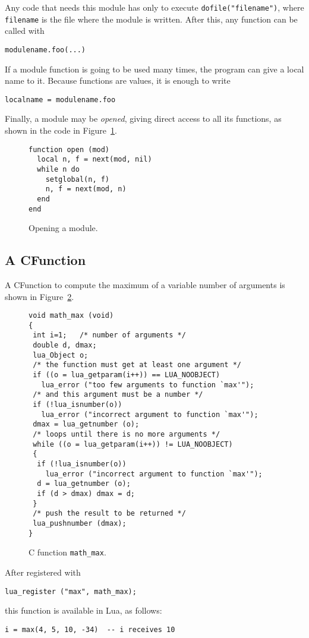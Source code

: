 Any code that needs this module has only to execute
\verb'dofile("filename")', where \verb'filename' is the file
where the module is written.
After this, any function can be called with
\begin{verbatim}
modulename.foo(...)
\end{verbatim}

If a module function is going to be used many times,
the program can give a local name to it.
Because functions are values, it is enough to write
\begin{verbatim}
localname = modulename.foo
\end{verbatim}
Finally, a module may be {\em opened},
giving direct access to all its functions,
as shown in the code in Figure~\ref{openmod}.
\begin{figure}
\Line
\begin{verbatim}
function open (mod)
  local n, f = next(mod, nil)
  while n do
    setglobal(n, f)
    n, f = next(mod, n)
  end
end
\end{verbatim}
\caption{Opening a module.\label{openmod}}
\Line
\end{figure}

\subsection{A CFunction} \label{exCFunction}
A CFunction to compute the maximum of a variable number of arguments
is shown in Figure~\ref{Cmax}.
\begin{figure}
\Line
\begin{verbatim}
void math_max (void)
{
 int i=1;   /* number of arguments */
 double d, dmax;
 lua_Object o;
 /* the function must get at least one argument */
 if ((o = lua_getparam(i++)) == LUA_NOOBJECT)
   lua_error ("too few arguments to function `max'");
 /* and this argument must be a number */
 if (!lua_isnumber(o))
   lua_error ("incorrect argument to function `max'");
 dmax = lua_getnumber (o);
 /* loops until there is no more arguments */
 while ((o = lua_getparam(i++)) != LUA_NOOBJECT)
 {
  if (!lua_isnumber(o))
    lua_error ("incorrect argument to function `max'");
  d = lua_getnumber (o);
  if (d > dmax) dmax = d;
 }
 /* push the result to be returned */
 lua_pushnumber (dmax);
}
\end{verbatim}
\caption{C function {\tt math\_max}.\label{Cmax}}
\Line
\end{figure}
After registered with
\begin{verbatim}
lua_register ("max", math_max);
\end{verbatim}
this function is available in Lua, as follows:
\begin{verbatim}
i = max(4, 5, 10, -34)  -- i receives 10
\end{verbatim}



